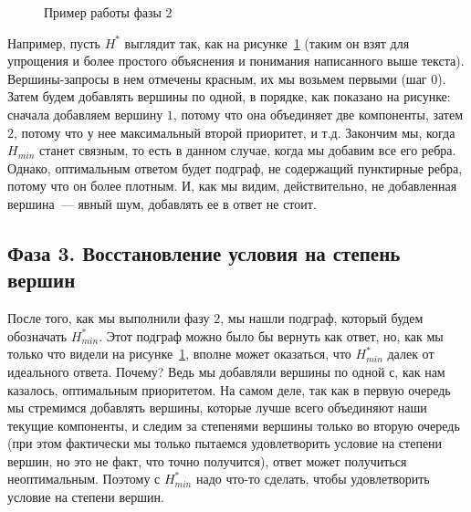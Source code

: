 \begin{figure}[!h]
\caption{Пример работы фазы $2$}\label{phase2-example}
\centering
  \begin{center}
  \end{center}
\end{figure}

Например, пусть $H^*$ выглядит так, как на рисунке~\ref{phase2-example} (таким он взят для упрощения и более простого объяснения и понимания написанного выше текста). Вершины-запросы в нем отмечены красным, их мы возьмем первыми (шаг $0$). Затем будем добавлять вершины по одной, в порядке, как показано на рисунке: сначала добавляем вершину $1$, потому что она объединяет две компоненты, затем $2$, потому что у нее максимальный второй приоритет, и т.д. Закончим мы, когда $H_{min}$ станет связным, то есть в данном случае, когда мы добавим все его ребра. Однако, оптимальным ответом будет подграф, не содержащий пунктирные ребра, потому что он более плотным. И, как мы видим, действительно, не добавленная вершина~--- явный шум, добавлять ее в ответ не стоит.

\subsection{Фаза 3. Восстановление условия на степень вершин}

После того, как мы выполнили фазу $2$, мы нашли подграф, который будем обозначать $H_{min}^*$. Этот подграф можно было бы вернуть как ответ, но, как мы только что видели на рисунке~\ref{phase2-example}, вполне может оказаться, что $H_{min}^*$ далек от идеального ответа. Почему? Ведь мы добавляли вершины по одной с, как нам казалось, оптимальным приоритетом. На самом деле, так как в первую очередь мы стремимся добавлять вершины, которые лучше всего объединяют наши текущие компоненты, и следим за степенями вершины только во вторую очередь (при этом фактически мы только пытаемся удовлетворить условие на степени вершин, но это не факт, что точно получится), ответ может получиться неоптимальным. Поэтому с $H_{min}^*$ надо что-то сделать, чтобы удовлетворить условие на степени вершин.

